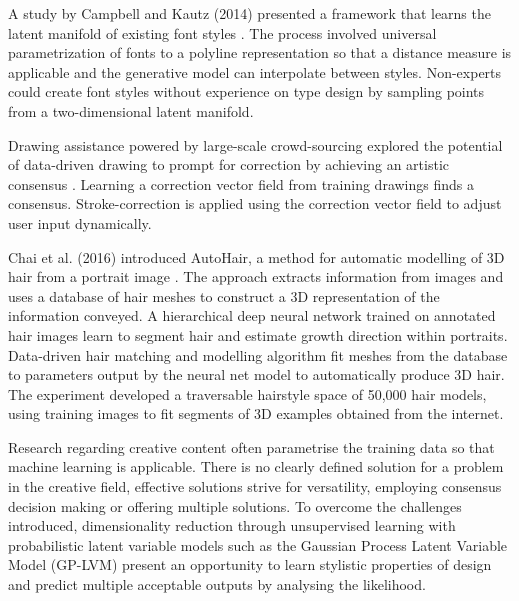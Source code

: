 \documentclass[ %
author={Dillon Keith Diep},
supervisor={Dr. Carl Henrik Ek},
degree={MEng},
title={ART-CG Hair:},
subtitle={Assisted Real-time Content Generation of Stylised Virtual Hair},
type={Research},
year={2017} ]{dissertation}
\begin{document}
	A study by Campbell and Kautz (2014) presented a framework that learns the latent manifold of existing font styles \cite{fontmanifold}. The process involved universal parametrization of fonts to a polyline representation so that a distance measure is applicable and the generative model can interpolate between styles. Non-experts could create font styles without experience on type design by sampling points from a two-dimensional latent manifold.
	
	Drawing assistance powered by large-scale crowd-sourcing explored the potential of data-driven drawing to prompt for correction by achieving an artistic consensus \cite{drawingassistance}. Learning a correction vector field from training drawings finds a consensus. Stroke-correction is applied using the correction vector field to adjust user input dynamically.
	
	Chai et al. (2016) introduced AutoHair, a method for automatic modelling of 3D hair from a portrait image \cite{autohair}. The approach extracts information from images and uses a database of hair meshes to construct a 3D representation of the information conveyed. A hierarchical deep neural network trained on annotated hair images learn to segment hair and estimate growth direction within portraits. Data-driven hair matching and modelling algorithm fit meshes from the database to parameters output by the neural net model to automatically produce 3D hair. The experiment developed a traversable hairstyle space of 50,000 hair models, using training images to fit segments of 3D examples obtained from the internet.
	
	Research regarding creative content often parametrise the training data so that machine learning is applicable. There is no clearly defined solution for a problem in the creative field, effective solutions strive for versatility, employing consensus decision making or offering multiple solutions. To overcome the challenges introduced, dimensionality reduction through unsupervised learning with probabilistic latent variable models such as the Gaussian Process Latent Variable Model (GP-LVM) \cite{gplvm} present an opportunity to learn stylistic properties of design and predict multiple acceptable outputs by analysing the likelihood.
	
\end{document}
